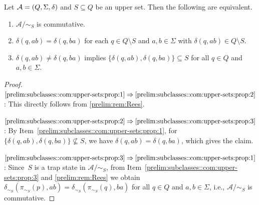 \begin{proposition} \label{prelim:subclasses::com:upper-sets:prop} 
	Let  $\mathcal A = (Q, \Sigma, \delta)$ and $S \subseteq Q$ be an upper set.
	Then the following are equivalent.
	\begin{enumerate}
		\item \label{prelim:subclasses::com:upper-sets:prop:1} $\mathcal A / {\sim_S}$ is commutative.
		
		\item \label{prelim:subclasses::com:upper-sets:prop:2} $\delta(q, ab) = \delta(q, ba)$ for each $q \in Q \setminus S$ and $a,b \in \Sigma$ with $\delta(q, ab) \in Q \setminus S$.
		
		\item \label{prelim:subclasses::com:upper-sets:prop:3} $\delta(q, ab) \ne \delta(q, ba)$
		implies
		$
		\{ \delta(q, ab), \delta(q, ba) \} \subseteq S
		$
		for all $q \in Q$ and $a,b \in \Sigma$.
	\end{enumerate}
\end{proposition}
\begin{proof}
	$\ref{prelim:subclasses::com:upper-sets:prop:1} \Rightarrow \ref{prelim:subclasses::com:upper-sets:prop:2}$: This directly follows from \cref{prelim:rem:Rees}.
	
	$\ref{prelim:subclasses::com:upper-sets:prop:2} \Rightarrow \ref{prelim:subclasses::com:upper-sets:prop:3}$: By Item~\ref{prelim:subclasses::com:upper-sets:prop:1},
	for $\{ \delta(q, ab), \delta(q, ba) \} \not\subseteq S$,
	we have  $\delta(q, ab) = \delta(q, ba)$,
	which gives the claim.
	
	$\ref{prelim:subclasses::com:upper-sets:prop:3} \Rightarrow \ref{prelim:subclasses::com:upper-sets:prop:1}$: Since~$S$ is a trap state in $\mathcal A / {\sim_S}$,
	from Item~\ref{prelim:subclasses::com:upper-sets:prop:3} and \cref{prelim:rem:Rees} we obtain $\delta_{\sim_S}(\pi_{\sim_S}(p), ab) = \delta_{\sim_S}(\pi_{\sim_S}(q), ba)$
	for all $q \in Q$ and $a,b \in \Sigma$, i.e., $\mathcal A / {\sim_S}$ is commutative.	
\end{proof}


